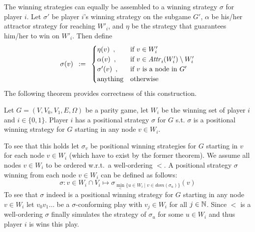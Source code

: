 The winning strategies can equally be assembled to a winning strategy $\sigma$ for player $i$. Let
$\sigma'$ be player $i$'s winning strategy on the subgame $G'$, $\alpha$ be his/her attractor strategy
for reaching $W'_i$, and $\eta$ be the strategy that guarantees him/her to win on $W'_i$. Then define
\begin{displaymath}
\sigma(v) \enspace := \enspace
\begin{cases}
\eta(v) \enspace, &\mbox{if } v \in W'_i \\
\alpha(v) \enspace, &\mbox{if } v \in \mathit{Attr}^{}_{i}(W'_i) \setminus W'_i \\
\sigma'(v) \enspace, &\mbox{if } v \mbox{ is a node in } G' \\
\mbox{anything} & \mbox{otherwise}
\end{cases}
\end{displaymath}
The following theorem provides correctness of this construction. 

\begin{proposition}
Let $G = (V,V_0,V_1,E,\Omega)$ be a parity game, let $W_i$ be the winning set of player $i$ and 
$i \in \{0,1\}$. Player $i$ has a positional strategy $\sigma$ for $G$ s.t. $\sigma$ is a positional 
winning strategy for $G$ starting in any node $v \in W_i$.
\end{proposition}

To see that this holds let $\sigma_v$ be positional winning strategies for $G$ starting in $v$ for each node 
$v \in W_i$ (which have to exist by the former theorem). We assume all nodes $v \in W_i$ to be ordered 
w.r.t.\ a well-ordering $<$. A positional strategy $\sigma$ winning from each node $v \in W_i$ can be 
defined as follows:
\begin{displaymath}
\sigma: v \in W_i \cap V_i \mapsto \sigma_{\min_{<} \{u \in W_i \mid v \in dom(\sigma_u)\}} (v)
\end{displaymath}
To see that $\sigma$ indeed is a positional winning strategy for $G$ starting in any node $v \in W_i$ let 
$v_0 v_1 \ldots$ be a $\sigma$-conforming play with $v_j \in W_i$ for all $j \in \mathbb{N}$. Since $<$ is a 
well-ordering $\sigma$ finally simulates the strategy of $\sigma_u$ for some $u \in W_i$ and thus player 
$i$ is wins this play.





